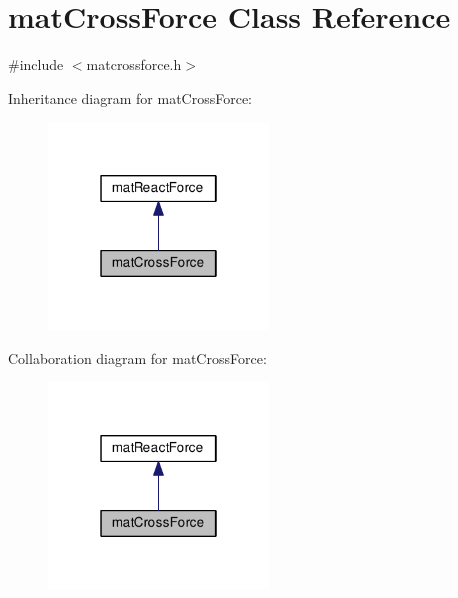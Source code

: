 \hypertarget{classmat_cross_force}{\section{mat\-Cross\-Force Class Reference}
\label{classmat_cross_force}
}


{\ttfamily \#include $<$matcrossforce.\-h$>$}



Inheritance diagram for mat\-Cross\-Force\-:\nopagebreak
\begin{figure}[H]
\begin{center}
\leavevmode
\includegraphics[width=166pt]{classmat_cross_force__inherit__graph}
\end{center}
\end{figure}


Collaboration diagram for mat\-Cross\-Force\-:\nopagebreak
\begin{figure}[H]
\begin{center}
\leavevmode
\includegraphics[width=166pt]{classmat_cross_force__coll__graph}
\end{center}
\end{figure}
